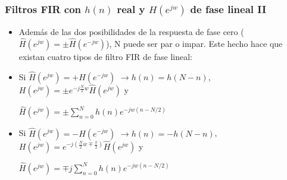 \begin{frame}
\frametitle{Filtros FIR con $h(n)$ real y $H(e^{jw})$ de fase lineal II}
\footnotesize
\begin{itemize}
\item Además de las dos posibilidades de la respuesta de fase cero ($\hat H(e^{jw})=\pm \hat H(e^{-jw})$), N puede ser par o impar. Este hecho hace que existan cuatro tipos de filtro FIR de fase lineal:

\item Si  \alert{$\hat H(e^{jw})=+ \hat H(e^{-jw})$}  \alert{$\rightarrow h(n)=h(N-n)$}, \alert{$H(e^{jw})=\pm e^{-j\frac{N}{2}w}\hat H(e^{jw})$} y

\hspace{3.5cm} \alert{$\hat H(e^{jw})=\pm\sum_{n=0}^{N} h(n) e^{-jw(n-N/2)}$  }

\begin{itemize}
\footnotesize


\vspace{0.2cm}
\end{itemize}

\item Si \alert{$\hat H(e^{jw})=- \hat H(e^{-jw})$} \alert{$\rightarrow h(n)=-h(N-n)$}, \alert{$H(e^{jw})= e^{-j(\frac{N}{2}w \mp \frac{\pi}{2})}\hat H(e^{jw})$} y

\hspace{3.5cm} \alert{$\hat H(e^{jw})=\mp j \sum_{n=0}^{N} h(n) e^{-jw(n-N/2)}$  }


\begin{itemize}
\footnotesize

\end{itemize}
\end{itemize}
\end{frame}
